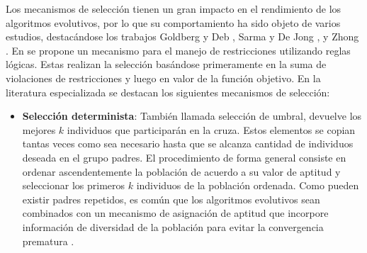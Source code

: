 Los mecanismos de selección tienen un gran impacto en el rendimiento de los algoritmos evolutivos, por lo que su comportamiento ha sido objeto de varios estudios, destacándose los trabajos Goldberg y Deb \cite{Goldberg91acomparative}, Sarma y De Jong \cite{sarma1997analysis} , y Zhong \cite{Zhong_comparisonof}. En \cite{deb_efficient_1998} se propone un mecanismo para el manejo de restricciones utilizando reglas lógicas. Estas realizan la selección basándose primeramente en la suma de violaciones de restricciones y luego en valor de la función objetivo. En la literatura especializada se destacan los siguientes mecanismos de selección:
\begin{itemize}
\item\textbf{Selección determinista}: También llamada selección de umbral, devuelve los mejores $k$ individuos que participarán en la cruza. Estos elementos se copian tantas veces como sea necesario hasta que se alcanza cantidad de individuos deseada  en el grupo padres. El procedimiento de forma general consiste en ordenar ascendentemente la población de acuerdo a su valor de aptitud y seleccionar los primeros $k$ individuos de la población ordenada. Como pueden existir padres repetidos, es común que los algoritmos evolutivos sean combinados con un mecanismo de asignación de aptitud que incorpore información de diversidad de la población para evitar la convergencia prematura \cite{laessig_threshold_2008}.


\end{itemize}
